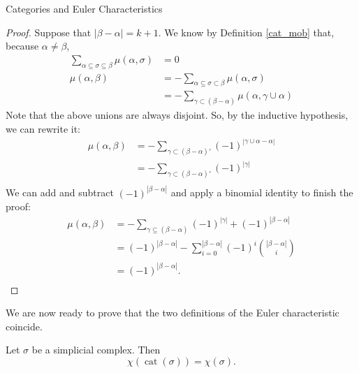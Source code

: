 \documentclass[12pt]{pom_thesis}
\DeclareMathOperator{\cat}{cat}
\begin{document}
\begin{chapter}{Categories and Euler Characteristics}
\begin{proof}
Suppose that $|\beta - \alpha| = k+1$. We know by Definition \ref{cat_mob} that, because $\alpha \neq \beta$,
 \begin{align*}
\sum_{\alpha \subseteq \sigma \subseteq \beta} \mu(\alpha, \sigma)&= 0\\
\mu(\alpha, \beta) &=  - \sum_{\alpha \subseteq \sigma \subset \beta} \mu(\alpha, \sigma)\\
&= - \sum_{\gamma \subset (\beta - \alpha)} \mu(\alpha, \gamma \cup \alpha) 
\end{align*}
Note that the above unions are always disjoint. So, by the inductive hypothesis, we can rewrite it:
\begin{align*}
\mu(\alpha, \beta) &= - \sum_{\gamma \subset (\beta - \alpha)'} (-1)^{|\gamma \cup \alpha - \alpha|} \\ %
&= - \sum_{\gamma \subset (\beta - \alpha)'} (-1)^{|\gamma|}\\ %
\end{align*}
We can add and subtract $(-1)^{|\beta - \alpha|}$ and apply a binomial identity to finish the proof:
\begin{align*}
\mu(\alpha, \beta) &= - \sum_{\gamma \subseteq (\beta - \alpha)} (-1)^{|\gamma|} + (-1)^{|\beta - \alpha|} \\ 
&= (-1)^{|\beta - \alpha|} -  \sum_{i = 0}^{|\beta - \alpha|}(-1)^i{|\beta- \alpha| \choose i}\\ 
&= (-1)^{|\beta - \alpha|} .\\ 
\end{align*}
\end{proof}
We are now ready to prove that the two definitions of the Euler characteristic coincide.
\begin{thm}
\label{consistentEuler}
Let $\sigma$ be a simplicial complex. Then 
\[
\chi(\cat(\sigma)) = \chi(\sigma).
\]


\end{thm}
\end{chapter}
\end{document}
